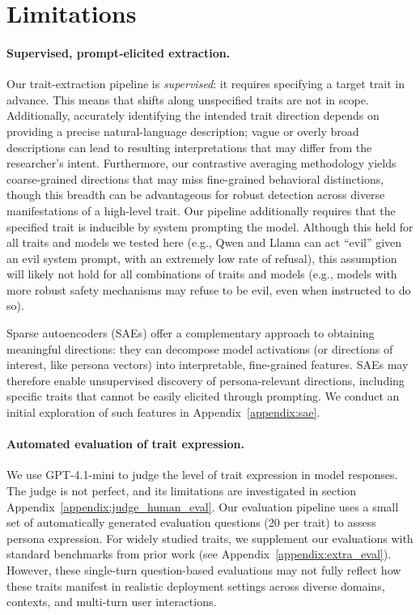 \section{Limitations}

\paragraph{Supervised, prompt‑elicited extraction.}
Our trait-extraction pipeline is \emph{supervised}: it requires specifying a target trait in advance. This means that shifts along unspecified traits are not in scope.
Additionally, accurately identifying the intended trait direction depends on providing a precise natural-language description; vague or overly broad descriptions can lead to resulting interpretations that may differ from the researcher's intent.
Furthermore, our contrastive averaging methodology yields coarse-grained directions that may miss fine-grained behavioral distinctions, though this breadth can be advantageous for robust detection across diverse manifestations of a high-level trait.
Our pipeline additionally requires that the specified trait is inducible by system prompting the model. Although this held for all traits and models we tested here (e.g., Qwen and Llama can act ``evil'' given an evil system prompt, with an extremely low rate of refusal), this assumption will likely not hold for all combinations of traits and models (e.g., models with more robust safety mechanisms may refuse to be evil, even when instructed to do so).

Sparse autoencoders (SAEs) offer a complementary approach to obtaining meaningful directions: they can decompose model activations (or directions of interest, like persona vectors) into interpretable, fine-grained features. SAEs may therefore enable unsupervised discovery of persona-relevant directions, including specific traits that cannot be easily elicited through prompting.
We conduct an initial exploration of such features in Appendix~\ref{appendix:sae}.

\paragraph{Automated evaluation of trait expression.}
We use GPT-4.1-mini to judge the level of trait expression in model responses. The judge is not perfect, and its limitations are investigated in section Appendix~\ref{appendix:judge_human_eval}.
Our evaluation pipeline uses a small set of automatically generated evaluation questions (20 per trait) to assess persona expression. For widely studied traits, we supplement our evaluations with standard benchmarks from prior work (see Appendix~\ref{appendix:extra_eval}).
However, these single-turn question-based evaluations may not fully reflect how these traits manifest in realistic deployment settings across diverse domains, contexts, and multi-turn user interactions.
